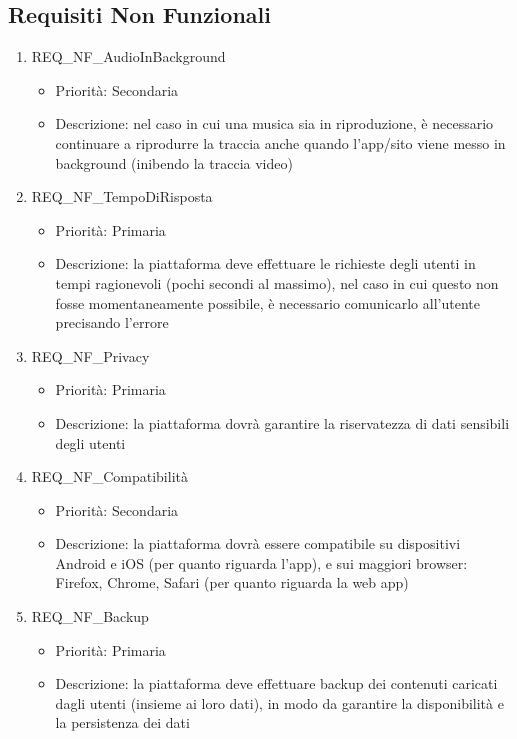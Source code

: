 \subsection{Requisiti Non Funzionali}

\begin{enumerate}
	\item REQ\_NF\_AudioInBackground
		\begin{itemize}
		\item Priorità: Secondaria
		\item Descrizione: nel caso in cui una musica sia in riproduzione, è necessario continuare a riprodurre la traccia anche quando l'app/sito viene messo in background (inibendo la traccia video)
		\end{itemize}
	
	\item REQ\_NF\_TempoDiRisposta
		\begin{itemize}
		\item Priorità: Primaria
		\item Descrizione: la piattaforma deve effettuare le richieste degli utenti in tempi ragionevoli (pochi secondi al massimo), nel caso in cui questo non fosse momentaneamente possibile, è necessario comunicarlo all'utente precisando l'errore
		\end{itemize}

	\item REQ\_NF\_Privacy
		\begin{itemize}
		\item Priorità: Primaria
		\item Descrizione: la piattaforma dovrà garantire la riservatezza di dati sensibili degli utenti
		\end{itemize}

	\item REQ\_NF\_Compatibilità
		\begin{itemize}
		\item Priorità: Secondaria
		\item Descrizione: la piattaforma dovrà essere compatibile su dispositivi Android e iOS (per quanto riguarda l'app), e sui maggiori browser: Firefox, Chrome, Safari (per quanto riguarda la web app)
		\end{itemize}
	
	\item REQ\_NF\_Backup
		\begin{itemize}
		\item Priorità: Primaria
		\item Descrizione: la piattaforma deve effettuare backup dei contenuti caricati dagli utenti (insieme ai loro dati), in modo da garantire la disponibilità e la persistenza dei dati
		\end{itemize}


\end{enumerate}
